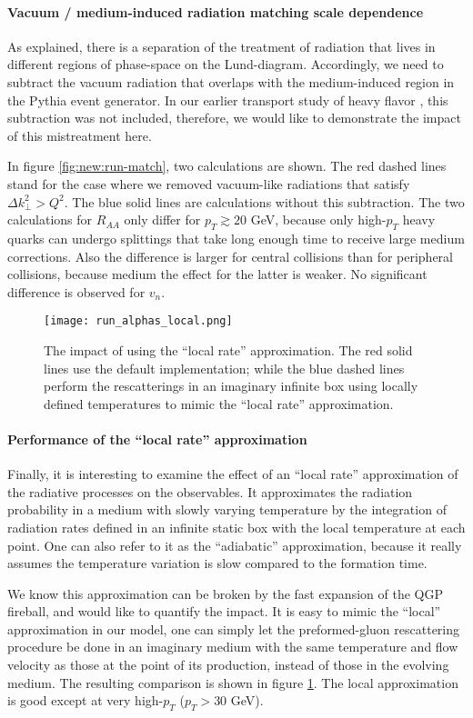 \paragraph{Vacuum / medium-induced radiation matching scale dependence}
As explained, there is a separation of the treatment of radiation that lives in different regions of phase-space on the Lund-diagram.
Accordingly, we need to subtract the vacuum radiation that overlaps with the medium-induced region in the Pythia event generator.
In our earlier transport study of heavy flavor \cite{Ke:2018tsh}, this subtraction was not included, therefore, we would like to demonstrate the impact of this mistreatment here.

In figure \ref{fig:new:run-match}, two calculations are shown. 
The red dashed lines stand for the case where we removed vacuum-like radiations that satisfy $\Delta k_\perp^2 > Q^2$.
The blue solid lines are calculations without this subtraction.
The two calculations for $R_{AA}$ only differ for $p_T\gtrsim 20$ GeV, because only high-$p_T$ heavy quarks can undergo splittings that take long enough time to receive large medium corrections.
Also the difference is larger for central collisions than for peripheral collisions, because medium the effect for the latter is weaker.
No significant difference is observed for $v_n$.

\begin{figure}
\singlespacing
\centering
\texttt{[image: run\_alphas\_local.png]}
\caption[The impact of using the ``local rate'' approximation. The red]{The impact of using the ``local rate'' approximation. The red solid lines use the default implementation; while the blue dashed lines perform the rescatterings in an imaginary infinite box using locally defined temperatures to mimic the ``local rate'' approximation.}
\label{fig:new:run-local}
\end{figure}

\paragraph{Performance of the ``local rate'' approximation}
Finally, it is interesting to examine the effect of an ``local rate'' approximation of the radiative processes on the observables.
It approximates the radiation probability in a medium with slowly varying temperature by the integration of radiation rates defined in an infinite static box with the local temperature at each point.
One can also refer to it as the ``adiabatic'' approximation, because it really assumes the temperature variation is slow compared to the formation  time.

We know this approximation can be broken by the fast expansion of the QGP fireball, and would like to quantify the impact.
It is easy to mimic the ``local'' approximation in our model, one can simply let the preformed-gluon rescattering procedure be done in an imaginary medium with the same temperature and flow velocity as those at the point of its production, instead of those in the evolving medium.
The resulting comparison is shown in figure \ref{fig:new:run-local}.
The local approximation is good except at very high-$p_T$ ($p_T > 30$ GeV).

